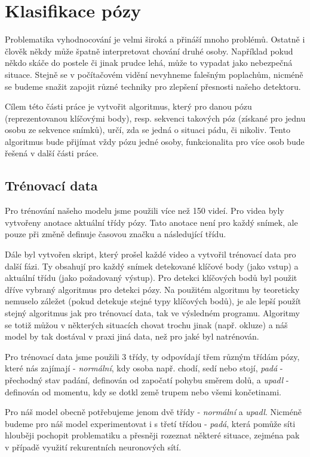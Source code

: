 \chapter{Klasifikace pózy}
\label{sec:PoseClassification}

Problematika vyhodnocování je velmi široká a přináší mnoho problémů. Ostatně i
člověk někdy může špatně interpretovat chování druhé osoby. Například pokud
někdo skáče do postele či jinak prudce lehá, může to vypadat jako nebezpečná
situace. Stejně se v počítačovém vidění nevyhneme falešným poplachům, nicméně
se budeme snažit zapojit různé techniky pro zlepšení přesnosti našeho
detektoru.

Cílem této části práce je vytvořit algoritmus, který pro danou pózu
(reprezentovanou klíčovými body), resp. sekvenci takových póz (získané pro
jednu osobu ze sekvence snímků), určí, zda se jedná o situaci pádu, či nikoliv.
Tento algoritmus bude přijímat vždy pózu jedné osoby, funkcionalita pro více
osob bude řešená v další části práce.

\section{Trénovací data}

Pro trénování našeho modelu jsme použili více než 150 videí. Pro videa byly
vytvořeny anotace aktuální třídy pózy. Tato anotace není pro každý snímek, ale
pouze při změně definuje časovou značku a následující třídu.

Dále byl vytvořen skript, který prošel každé video a vytvořil trénovací data
pro další fázi. Ty obsahují pro každý snímek detekované klíčové body (jako
vstup) a aktuální třídu (jako požadovaný výstup). Pro detekci klíčových bodů
byl použit dříve vybraný algoritmus pro detekci pózy. Na použitém algoritmu by
teoreticky nemuselo záležet (pokud detekuje stejné typy klíčových bodů), je ale
lepší použít stejný algoritmus jak pro trénovací data, tak ve výsledném
programu. Algoritmy se totiž můžou v některých situacích chovat trochu jinak
(např. okluze) a náš model by tak dostával v praxi jiná data, než pro jaké byl
natrénován.

Pro trénovací data jsme použili 3 třídy, ty odpovídají třem různým třídám pózy,
které nás zajímají - \textit{normální}, kdy osoba např. chodí, sedí nebo stojí,
\textit{padá} - přechodný stav padání, definován od započatí pohybu směrem
dolů, a \textit{upadl} - definován od momentu, kdy se dotkl země trupem nebo
všemi končetinami.

Pro náš model obecně potřebujeme jenom dvě třídy - \textit{normální} a
\textit{upadl}. Nicméně budeme pro náš model experimentovat i s třetí třídou -
\textit{padá}, která pomůže síti hlouběji pochopit problematiku a přesněji
rozeznat některé situace, zejména pak v případě využití rekurentních
neuronových sítí.

